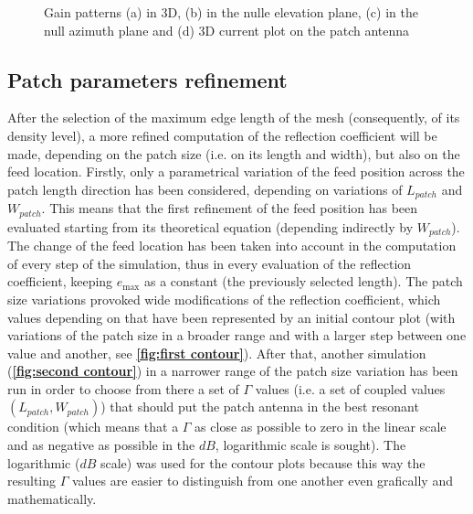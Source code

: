 \documentclass[12pt,a4paper,twocolumn]{article}
\begin{document}
{\begin{figure}[bt!]
		\begin{subfigure}{0.28\linewidth}
				\def\svgwidth{\linewidth}
			\tiny{}
			\caption{}	\end{subfigure}
		\hfill
		\begin{subfigure}{0.28\linewidth}
					\def\svgwidth{\linewidth}
			\tiny{}
			\caption{}	\end{subfigure}
		\hfill
		\begin{subfigure}{0.34\linewidth}
					\def\svgwidth{\linewidth}
			\tiny{}
			\caption{} \end{subfigure}
		\hfill
		\caption{\selectfont
			\color{gray}
			Gain patterns (a) in 3D, (b) in the nulle elevation plane, (c) in the null azimuth plane and (d) 3D current plot on the patch antenna }
\end{figure}



\subsection*{Patch parameters refinement}
After the selection of the maximum edge length of the mesh (consequently, of its density level), a more refined computation of the reflection coefficient will be made, depending on the patch size (i.e. on its length and width), but also on the feed location. Firstly, only a parametrical variation of the feed position across the patch length direction has been considered, depending on variations of $L_{patch}$ and $W_{patch}$. This means that the first refinement of the feed position has been evaluated starting from its theoretical equation (depending indirectly by $W_{patch}$). The change of the feed location has been taken into account in the computation of every step of the simulation, thus in every evaluation of the reflection coefficient, keeping $e_{\max}$ as a constant (the previously selected length). The patch size variations provoked wide modifications of the reflection coefficient, which values depending on that have been represented by an initial contour plot (with variations of the patch size in a broader range and with a larger step between one value and another, see \textbf{\cref{fig:first contour}}). After that, another simulation (\textbf{\cref{fig:second contour}}) in a narrower range of the patch size variation has been run in order to choose from there a set of $\Gamma$ values (i.e. a set of coupled values $(L_{patch},W_{patch})$) that should put the patch antenna in the best resonant condition (which means that a $\Gamma$ as close as possible to zero in the linear scale and as negative as possible in the $dB$, logarithmic scale is sought). The logarithmic ($dB$ scale) was used for the contour plots because this way the resulting $\Gamma$ values are easier to distinguish from one another even grafically and mathematically. 


}
\end{document}
